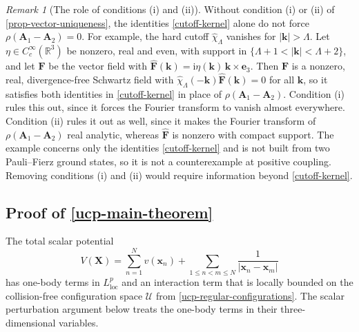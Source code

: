 \documentclass[final,reqno]{amsart}
\theoremstyle{remark}
\newtheorem{remark}{Remark}
\newcommand{\RR}{\mathbb{R}}
\renewcommand{\i}{\mathrm{i}}
\newcommand{\ve}{\mathbf{e}}
\newcommand{\vk}{\mathbf{k}}
\newcommand{\vx}{\mathbf{x}}
\newcommand{\vA}{{\mathbf{A}}}
\newcommand{\vF}{{\mathbf{F}}}
\newcommand{\vX}{{\mathbf{X}}}
\newcommand{\wh}[1]{\widehat{#1}}
\begin{document}
\begin{remark}[The role of conditions (i) and (ii)]\label{rem-cutoff-kernel}
Without condition (i) or (ii) of \cref{prop-vector-uniqueness}, the
identities \cref{cutoff-kernel} alone do not force
$\rho(\vA_1-\vA_2)=0$.  For example, the hard cutoff
$\wh\chi_\Lambda$ vanishes for $|\vk|>\Lambda$.  Let
$\eta\in C_c^\infty(\RR^3)$ be nonzero, real and even, with support in
$\{\Lambda+1<|\vk|<\Lambda+2\}$, and let $\vF$ be the vector field with
$\wh\vF(\vk)=\i\eta(\vk)\,\vk\times\ve_3$.  Then $\vF$ is a nonzero,
real, divergence-free Schwartz field with
$\wh\chi_\Lambda(-\vk)\wh\vF(\vk)=0$ for all $\vk$, so it satisfies
both identities in \cref{cutoff-kernel} in place of
$\rho(\vA_1-\vA_2)$.  Condition (i) rules this out, since it forces the
Fourier transform to vanish almost everywhere.  Condition (ii) rules it
out as well, since it makes the Fourier transform of
$\rho(\vA_1-\vA_2)$ real analytic, whereas $\wh\vF$ is nonzero with
compact support.  The example concerns only the identities
\cref{cutoff-kernel} and is not built from two Pauli--Fierz ground
states, so it is not a counterexample at positive coupling.  Removing
conditions (i) and (ii) would require information beyond
\cref{cutoff-kernel}.
\end{remark}

\subsection{Proof of \texorpdfstring{\cref{ucp-main-theorem}}{Theorem }}\label{sec-ucp}

The total scalar potential
\[
 V(\vX)=\sum_{n=1}^N v(\vx_n)+\sum_{1\leq n<m\leq N}\frac{1}{|\vx_n-\vx_m|}
\]
has one-body terms in $L^p_\mathrm{loc}$ and an interaction term that
is locally bounded on the collision-free configuration space
$\mathcal U$ from \cref{ucp-regular-configurations}.  The scalar perturbation argument
below treats the one-body terms in their three-dimensional variables.
\end{document}
